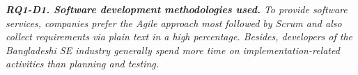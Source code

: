 
\begin{tcolorbox}[flushleft upper,boxrule=1pt,arc=0pt,left=0pt,right=0pt,top=0pt,bottom=0pt,colback=white,after=\ignorespacesafterend\par\noindent]
\nd\it{\bf{RQ1-D1. Software development methodologies used.}} To provide
software services, companies prefer the Agile approach most followed by Scrum
and also collect requirements via plain text in a high percentage. Besides,
developers of the Bangladeshi SE industry generally spend more time on
implementation-related activities than planning and testing. 
\end{tcolorbox}
